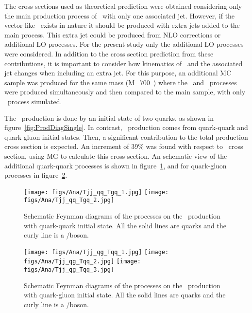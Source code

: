 The cross sections used as theoretical prediction were obtained considering only the main production process of \Tp~with only one associated jet. However, if the vector like \Tp~exists in nature it should be produced with extra jets added to the main process. This extra jet could be produced from NLO corrections or additional LO processes. For the present study only the additional LO processes were considered. In addition to the cross section prediction from these contributions, it is important to consider how kinematics of \Tp~and the associated jet changes when including an extra jet. For this purpose, an additional MC sample was produced for the same mass (M=700~\GeVcc) where the \Tj~and \Tjj~processes were produced simultaneously and then compared to the main sample, with only \Tj~process simulated.

The \Tj~production is done by an initial state of two quarks, as shown in figure~\ref{fig:ProdDiagSingle}. In contrast, \Tjj~production comes from quark-quark and quark-gluon initial states. Then, a significant contribution to the total production cross section is expected. An increment of 39\% was found with respect to \Tj~cross section, using MG to calculate this cross section. An schematic view of the additional quark-quark processes is shown in figure~\ref{fig:qqTjj}, and for quark-gluon processes in figure~\ref{fig:qgTjj}.

\begin{figure}[!hbtp]
  \begin{center}
    \texttt{[image: figs/Ana/Tjj\_qq\_Tgq\_1.jpg]}
    \texttt{[image: figs/Ana/Tjj\_qq\_Tgq\_2.jpg]}
    \caption{Schematic Feynman diagrams of the processes on the \Tjj~production with quark-quark initial state. All the solid lines are quarks and the curly line is a \Z/\W boson.}
    \label{fig:qqTjj}
  \end{center}
\end{figure}

\begin{figure}[!hbtp]
  \begin{center}
    \texttt{[image: figs/Ana/Tjj\_qg\_Tqq\_1.jpg]}
    \texttt{[image: figs/Ana/Tjj\_qg\_Tqq\_2.jpg]}
    \texttt{[image: figs/Ana/Tjj\_qg\_Tqq\_3.jpg]}
    \caption{Schematic Feynman diagrams of the processes on the \Tjj~production with quark-gluon initial state. All the solid lines are quarks and the curly line is a \Z/\W boson.}
    \label{fig:qgTjj}
  \end{center}
\end{figure}

